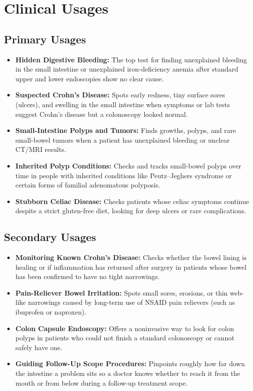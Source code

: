\section{Clinical Usages}

\subsection{Primary Usages}
\begin{itemize}
    \item \textbf{Hidden Digestive Bleeding:} The top test for finding unexplained bleeding in the small intestine or unexplained iron-deficiency anemia after standard upper and lower endoscopies show no clear cause.
    \item \textbf{Suspected Crohn's Disease:} Spots early redness, tiny surface sores (ulcers), and swelling in the small intestine when symptoms or lab tests suggest Crohn's disease but a colonoscopy looked normal.
    \item \textbf{Small-Intestine Polyps and Tumors:} Finds growths, polyps, and rare small-bowel tumors when a patient has unexplained bleeding or unclear CT/MRI results.
    \item \textbf{Inherited Polyp Conditions:} Checks and tracks small-bowel polyps over time in people with inherited conditions like Peutz--Jeghers syndrome or certain forms of familial adenomatous polyposis.
    \item \textbf{Stubborn Celiac Disease:} Checks patients whose celiac symptoms continue despite a strict gluten-free diet, looking for deep ulcers or rare complications.
\end{itemize}

\subsection{Secondary Usages}
\begin{itemize}
    \item \textbf{Monitoring Known Crohn's Disease:} Checks whether the bowel lining is healing or if inflammation has returned after surgery in patients whose bowel has been confirmed to have no tight narrowings.
    \item \textbf{Pain-Reliever Bowel Irritation:} Spots small sores, erosions, or thin web-like narrowings caused by long-term use of NSAID pain relievers (such as ibuprofen or naproxen).
    \item \textbf{Colon Capsule Endoscopy:} Offers a noninvasive way to look for colon polyps in patients who could not finish a standard colonoscopy or cannot safely have one.
    \item \textbf{Guiding Follow-Up Scope Procedures:} Pinpoints roughly how far down the intestine a problem sits so a doctor knows whether to reach it from the mouth or from below during a follow-up treatment scope.
\end{itemize}

